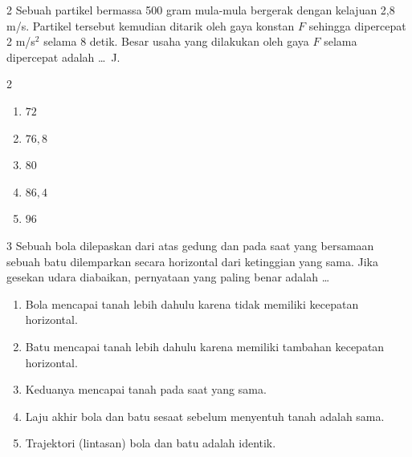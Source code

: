 \documentclass[11pt]{article}
\newenvironment{pil}{%
  \begin{enumerate}[label=(\Alph*),leftmargin=*,itemsep=1pt,topsep=3pt]}%
  {\end{enumerate}}
\newenvironment{pilB}{%
  \par\smallskip\begin{multicols}{2}
  \begin{enumerate}[label=(\Alph*),leftmargin=*,itemsep=1pt,topsep=3pt]}%
  {\end{enumerate}\end{multicols}}
\begin{document}
\begin{soal}{2}  %
Sebuah partikel bermassa 500 gram mula-mula bergerak dengan kelajuan
2,8 m/s. Partikel tersebut kemudian ditarik oleh gaya konstan $F$
sehingga dipercepat 2 m/s$^2$ selama 8 detik. Besar usaha yang
dilakukan oleh gaya $F$ selama dipercepat adalah \ldots\ J.
\begin{pilB}
  \item $72$ \item $76{,}8$ \item $80$ \item $86{,}4$ \item $96$
\end{pilB}
\end{soal}

\begin{soal}{3}  %
Sebuah bola dilepaskan dari atas gedung dan pada saat yang bersamaan
sebuah batu dilemparkan secara horizontal dari ketinggian yang sama.
Jika gesekan udara diabaikan, pernyataan yang paling benar adalah \ldots
\begin{pil}
  \item Bola mencapai tanah lebih dahulu karena tidak memiliki
        kecepatan horizontal.
  \item Batu mencapai tanah lebih dahulu karena memiliki tambahan
        kecepatan horizontal.
  \item Keduanya mencapai tanah pada saat yang sama.
  \item Laju akhir bola dan batu sesaat sebelum menyentuh tanah
        adalah sama.
  \item Trajektori (lintasan) bola dan batu adalah identik.
\end{pil}
\end{soal}
\end{document}

